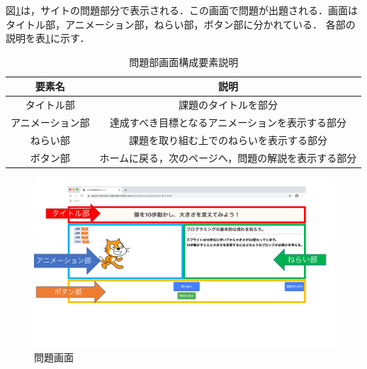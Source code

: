 図\ref{fig:mondaigamen1}は，サイトの問題部分で表示される．この画面で問題が出題される．画面はタイトル部，アニメーション部，ねらい部，ボタン部に分かれている．
各部の説明を表\ref{tab:site1}に示す．
\begin{table}[htb]
\begin{center}
    \caption{問題部画面構成要素説明}
  \begin{tabular}{|c|c|} \hline
     要素名  & 説明  \\ \hline
     タイトル部& 課題のタイトルを部分 \\ \hline
      アニメーション部& 達成すべき目標となるアニメーションを表示する部分 \\ \hline
      ねらい部& 課題を取り組む上でのねらいを表示する部分 \\ \hline
      ボタン部& ホームに戻る，次のページへ，問題の解説を表示する部分\\ \hline
  \end{tabular}
  \label{tab:site1}
  \end{center}
\end{table}
\begin{figure}[h]
\begin{center}
\includegraphics[width=15cm]{mondaigamen.pdf}
\caption{問題画面}
\label{fig:mondaigamen1}
\end{center}
\end{figure}

\newpage

